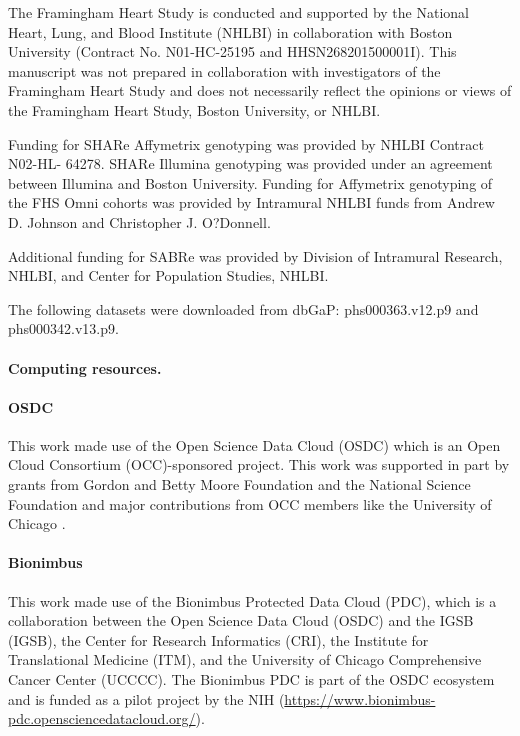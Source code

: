 \documentclass[10pt,letterpaper]{article}
\begin{document}
The Framingham Heart Study is conducted and supported by the National Heart, Lung, and Blood Institute (NHLBI) in collaboration with Boston University (Contract No. N01-HC-25195 and HHSN268201500001I). This manuscript was not prepared in collaboration with investigators of the Framingham Heart Study and does not necessarily reflect the opinions or views of the Framingham Heart Study, Boston University, or NHLBI.

Funding for SHARe Affymetrix genotyping was provided by NHLBI Contract N02-HL- 64278. SHARe Illumina genotyping was provided under an agreement between Illumina and Boston University. Funding for Affymetrix genotyping of the FHS Omni cohorts was provided by Intramural NHLBI funds from Andrew D. Johnson and Christopher J. O?Donnell.

Additional funding for SABRe was provided by Division of Intramural Research, NHLBI, and Center for Population Studies, NHLBI.

The following datasets were downloaded from dbGaP: phs000363.v12.p9 and phs000342.v13.p9.

\paragraph{Computing resources.}\label{computing-resources}

\paragraph{OSDC}

This work made use of the Open Science Data Cloud (OSDC) which is an
Open Cloud Consortium (OCC)-sponsored project. This work was supported
in part by grants from Gordon and Betty Moore Foundation and the
National Science Foundation and major contributions from OCC members
like the University of Chicago \cite{grossman2012design}.

\paragraph{Bionimbus}
This work made use of the
Bionimbus Protected Data Cloud (PDC), which is a collaboration between
the Open Science Data Cloud (OSDC) and the IGSB (IGSB), the Center for
Research Informatics (CRI), the Institute for Translational Medicine
(ITM), and the University of Chicago Comprehensive Cancer Center
(UCCCC). The Bionimbus PDC is part of the OSDC ecosystem and is funded
as a pilot project by the NIH \cite{heath2014bionimbus} (\url{https://www.bionimbus-pdc.opensciencedatacloud.org/}).
\end{document}
